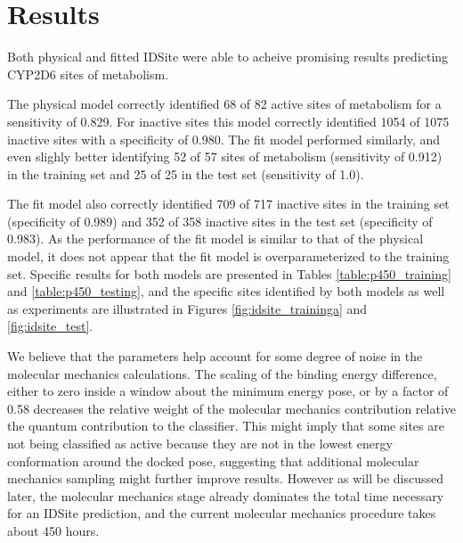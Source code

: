 \section{Results}
\label{section:p450/results}
Both physical and fitted IDSite were able to acheive promising results predicting CYP2D6 sites of metabolism.

The physical model correctly identified 68 of 82 active sites of metabolism for a sensitivity of 0.829.
For inactive sites this model correctly identified 1054 of 1075 inactive sites with a specificity of 0.980.
The fit model performed similarly, and even slighly better identifying 52 of 57 sites of metabolism (sensitivity of 0.912) in the training set and 25 of 25 in the test set (sensitivity of 1.0).




The fit model also correctly identified 709 of 717 inactive sites in the training set (specificity of 0.989) and 352 of 358 inactive sites in the test set (specificity of 0.983).
As the performance of the fit model is similar to that of the physical model, it does not appear that the fit model is overparameterized to the training set.
Specific results for both models are presented in Tables \ref{table:p450_training} and \ref{table:p450_testing}, and the specific sites identified by both models as well as experiments are illustrated in Figures \ref{fig:idsite_traininga} and \ref{fig:idsite_test}. 

We believe that the parameters help account for some degree of noise in the molecular mechanics calculations.
The scaling of the binding energy difference, either to zero inside a window about the minimum energy pose, or by a factor of 0.58 decreases the relative weight of the molecular mechanics contribution relative the quantum contribution to the classifier.
This might imply that some sites are not being classified as active because they are not in the lowest energy conformation around the docked pose, suggesting that additional molecular mechanics sampling might further improve results.
However as will be discussed later, the molecular mechanics stage already dominates the total time necessary for an IDSite prediction, and the current molecular mechanics procedure takes about 450 hours.   



